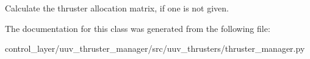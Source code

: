 \begin{DoxyVerb}Calculate the thruster allocation matrix, if one is not given.\end{DoxyVerb}
 

The documentation for this class was generated from the following file\+:\begin{DoxyCompactItemize}
\item 
control\+\_\+layer/uuv\+\_\+thruster\+\_\+manager/src/uuv\+\_\+thrusters/thruster\+\_\+manager.\+py\end{DoxyCompactItemize}

